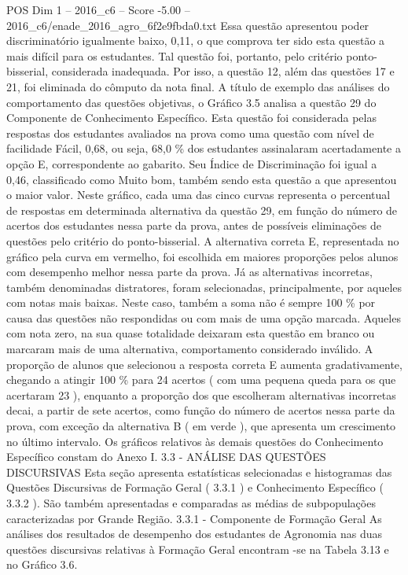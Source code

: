 \begin{textsample}{POS Dim 1 – 2016\_c6 – Score -5.00 – 2016\_c6/enade\_2016\_agro\_6f2e9fbda0.txt}
Essa questão apresentou poder discriminatório igualmente baixo, 0,11, o que comprova ter sido esta questão a mais difícil para os estudantes.
Tal questão foi, portanto, pelo critério ponto-bisserial, considerada inadequada.
Por isso, a questão 12, além das questões 17 e 21, foi eliminada do cômputo da nota final.
A título de exemplo das análises do comportamento das questões objetivas, o Gráfico 3.5 analisa a questão 29 do Componente de Conhecimento Específico.
Esta questão foi considerada pelas respostas dos estudantes avaliados na prova como uma questão com nível de facilidade Fácil, 0,68, ou seja, 68,0 \% dos estudantes assinalaram acertadamente a opção E, correspondente ao gabarito.
Seu Índice de Discriminação foi igual a 0,46, classificado como Muito bom, também sendo esta questão a que apresentou o maior valor.
Neste gráfico, cada uma das cinco curvas representa o percentual de respostas em determinada alternativa da questão 29, em função do número de acertos dos estudantes nessa parte da prova, antes de possíveis eliminações de questões pelo critério do ponto-bisserial.
A alternativa correta E, representada no gráfico pela curva em vermelho, foi escolhida em maiores proporções pelos alunos com desempenho melhor nessa parte da prova.
Já as alternativas incorretas, também denominadas distratores, foram selecionadas, principalmente, por aqueles com notas mais baixas.
Neste caso, também a soma não é sempre 100 \% por causa das questões não respondidas ou com mais de uma opção marcada.
Aqueles com nota zero, na sua quase totalidade deixaram esta questão em branco ou marcaram mais de uma alternativa, comportamento considerado inválido.
A proporção de alunos que selecionou a resposta correta E aumenta gradativamente, chegando a atingir 100 \% para 24 acertos ( com uma pequena queda para os que acertaram 23 ), enquanto a proporção dos que escolheram alternativas incorretas decai, a partir de sete acertos, como função do número de acertos nessa parte da prova, com exceção da alternativa B ( em verde ), que apresenta um crescimento no último intervalo.
Os gráficos relativos às demais questões do Conhecimento Específico constam do Anexo I. 3.3 - ANÁLISE DAS QUESTÕES DISCURSIVAS Esta seção apresenta estatísticas selecionadas e histogramas das Questões Discursivas de Formação Geral ( 3.3.1 ) e Conhecimento Específico ( 3.3.2 ).
São também apresentadas e comparadas as médias de subpopulações caracterizadas por Grande Região. 3.3.1 - Componente de Formação Geral As análises dos resultados de desempenho dos estudantes de Agronomia nas duas questões discursivas relativas à Formação Geral encontram -se na Tabela 3.13 e no Gráfico 3.6.

\end{textsample}
